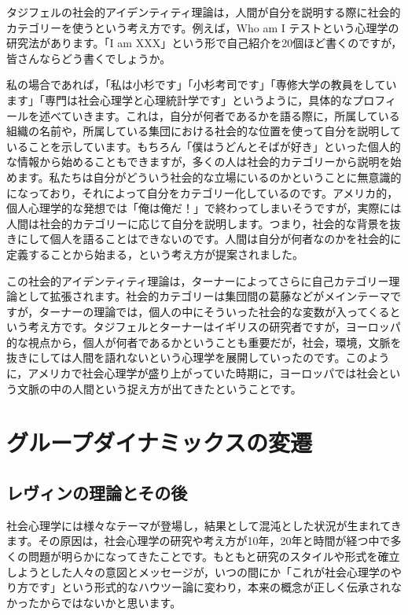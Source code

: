 \documentclass{ltjsbook}
\begin{document}
タジフェルの社会的アイデンティティ理論は，人間が自分を説明する際に社会的カテゴリーを使うという考え方です。例えば，Who am I テストという心理学の研究法があります。「I am XXX」という形で自己紹介を20個ほど書くのですが，皆さんならどう書くでしょうか。

私の場合であれば，「私は小杉です」「小杉考司です」「専修大学の教員をしています」「専門は社会心理学と心理統計学です」というように，具体的なプロフィールを述べていきます。これは，自分が何者であるかを語る際に，所属している組織の名前や，所属している集団における社会的な位置を使って自分を説明していることを示しています。もちろん「僕はうどんとそばが好き」といった個人的な情報から始めることもできますが，多くの人は社会的カテゴリーから説明を始めます。私たちは自分がどういう社会的な立場にいるのかということに無意識的になっており，それによって自分をカテゴリー化しているのです。アメリカ的，個人心理学的な発想では「俺は俺だ！」で終わってしまいそうですが，実際には人間は社会的カテゴリーに応じて自分を説明します。つまり，社会的な背景を抜きにして個人を語ることはできないのです。人間は自分が何者なのかを社会的に定義することから始まる，という考え方が提案されました。

この社会的アイデンティティ理論は，ターナーによってさらに自己カテゴリー理論として拡張されます。社会的カテゴリーは集団間の葛藤などがメインテーマですが，ターナーの理論では，個人の中にそういった社会的な変数が入ってくるという考え方です。タジフェルとターナーはイギリスの研究者ですが，ヨーロッパ的な視点から，個人が何者であるかということも重要だが，社会，環境，文脈を抜きにしては人間を語れないという心理学を展開していったのです。このように，アメリカで社会心理学が盛り上がっていた時期に，ヨーロッパでは社会という文脈の中の人間という捉え方が出てきたということです。

\section{グループダイナミックスの変遷}
\subsection{レヴィンの理論とその後}
社会心理学には様々なテーマが登場し，結果として混沌とした状況が生まれてきます。その原因は，社会心理学の研究や考え方が10年，20年と時間が経つ中で多くの問題が明らかになってきたことです。もともと研究のスタイルや形式を確立しようとした人々の意図とメッセージが，いつの間にか「これが社会心理学のやり方です」という形式的なハウツー論に変わり，本来の概念が正しく伝承されなかったからではないかと思います。
\end{document}
